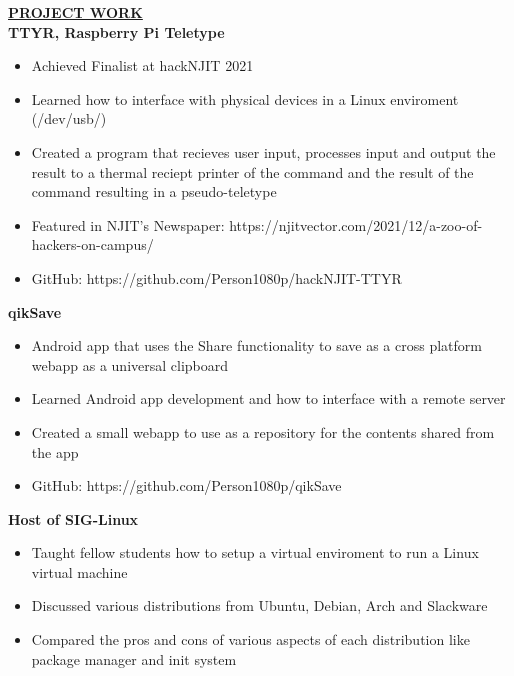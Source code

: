 \documentclass{article}
\begin{document}
%
%
\noindent \textbf{\underline{PROJECT WORK}} \\
\noindent \textbf{TTYR, Raspberry Pi Teletype} 
\begin{itemize}[noitemsep,nolistsep,leftmargin=*]
\item {Achieved Finalist at hackNJIT 2021}
\item {Learned how to interface with physical devices in a Linux enviroment (/dev/usb/)}
\item {Created a program that recieves user input, processes input and output
the result to a thermal reciept printer of the command and the result of the command resulting in 
a pseudo-teletype}
\item {Featured in NJIT's Newspaper: https://njitvector.com/2021/12/a-zoo-of-hackers-on-campus/}
\item {GitHub: https://github.com/Person1080p/hackNJIT-TTYR\\}
\end{itemize}

\noindent \textbf{qikSave} 
\begin{itemize}[noitemsep,nolistsep,leftmargin=*]
\item {Android app that uses the Share functionality to save as a cross platform webapp as a universal clipboard}
\item {Learned Android app development and how to interface with a remote server}
\item {Created a small webapp to use as a repository for the contents shared from the app }
\item {GitHub: https://github.com/Person1080p/qikSave \\}
\end{itemize}

\noindent \textbf{Host of SIG-Linux} 
\begin{itemize}[noitemsep,nolistsep,leftmargin=*]
\item {Taught fellow students how to setup a virtual enviroment to run a Linux virtual machine}
\item {Discussed various distributions from Ubuntu, Debian, Arch and Slackware}
\item {Compared the pros and cons of various aspects of each distribution like package manager and init system\\}
\end{itemize}
\end{document}
